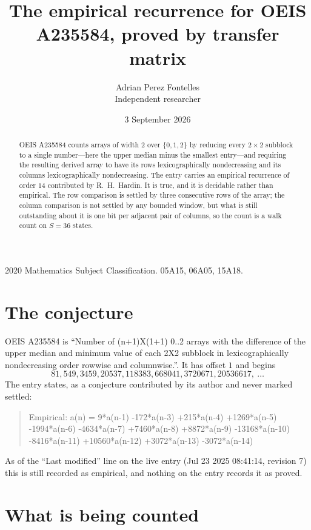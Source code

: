 \documentclass[11pt,a4paper]{article}
\title{The empirical recurrence for OEIS A235584, proved by transfer matrix}
\author{Adrian Perez Fontelles\\ \small Independent researcher}
\date{3 September 2026}
\theoremstyle{plain}
\theoremstyle{definition}
\begin{document}
\maketitle

\begin{abstract}
OEIS A235584 counts arrays of width $2$ over $\{0,1,2\}$ by reducing every $2\times2$ subblock to a
single number---here the upper median minus the smallest entry---and requiring the resulting derived array to have its rows
lexicographically nondecreasing and its columns lexicographically nondecreasing. The entry carries an
empirical recurrence of order $14$ contributed by R.~H.~Hardin. It is true, and it is
decidable rather than empirical. The row comparison is settled by three consecutive rows of the
array; the column comparison is not settled by any bounded window, but what is still outstanding
about it is one bit per adjacent pair of columns, so the count is a walk count on $S=36$
states.
\end{abstract}

\noindent\small 2020 Mathematics Subject Classification. 05A15, 06A05, 15A18.\normalsize

\section{The conjecture}

OEIS A235584 is ``Number of (n+1)X(1+1) 0..2 arrays with the difference of the upper median and minimum value of each 2X2 subblock in lexicographically nondecreasing order rowwise and columnwise.''. It has offset $1$ and begins
\[
81, 549, 3459, 20537, 118383, 668041, 3720671, 20536617,\ \dots
\]
The entry states, as a conjecture contributed by its author and never marked settled:
\begin{quote}
Empirical: a(n) = 9*a(n-1) -172*a(n-3) +215*a(n-4) +1269*a(n-5) -1994*a(n-6) -4634*a(n-7) +7460*a(n-8) +8872*a(n-9) -13168*a(n-10) -8416*a(n-11) +10560*a(n-12) +3072*a(n-13) -3072*a(n-14)
\end{quote}
As of the ``Last modified'' line on the live entry (Jul 23 2025 08:41:14, revision 7) this is still
recorded as empirical, and nothing on the entry records it as proved.

\section{What is being counted}
\end{document}
